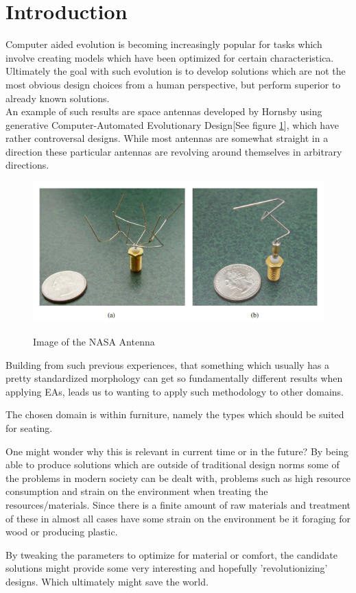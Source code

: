 \section{Introduction}
Computer aided evolution is becoming increasingly popular for tasks which involve creating models which have been optimized for certain characteristica.
Ultimately the goal with such evolution is to develop solutions which are not the most obvious design choices from a human perspective, but perform superior to already known solutions.\\

An example of such results are space antennas developed by Hornsby\cite{paper:ev4} using generative Computer-Automated Evolutionary Design[See figure \ref{fig:nasa_antenna}], which have rather controversal designs. While most antennas are somewhat straight in a direction these particular antennas are revolving around themselves in arbitrary directions.

\begin{figure}[ht]
\includegraphics[scale=.7]{content/img/space_antenna}
\label{fig:nasa_antenna}\\
\caption{Image of the NASA Antenna \cite{paper:ev4} }
\end{figure}

Building from such previous experiences, that something which usually has a pretty standardized morphology can get so fundamentally different results when applying EAs, leads us to wanting to apply such methodology to other domains.

The chosen domain is within furniture, namely the types which should be suited for seating.

One might wonder why this is relevant in current time or in the future?
By being able to produce solutions which are outside of traditional design norms some of the problems in modern society can be dealt with, problems such as high resource consumption and strain on the environment when treating the resources/materials. Since there is a finite amount of raw materials and treatment of these in almost all cases have some strain on the environment be it foraging for wood or producing plastic.


By tweaking the parameters to optimize for material or comfort, the candidate solutions might provide some very interesting and hopefully 'revolutionizing' designs. Which ultimately might save the world.

